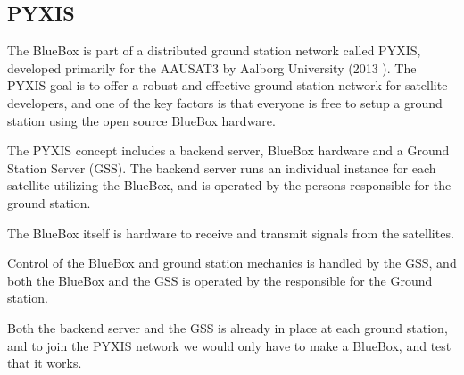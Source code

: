 \subsection{PYXIS}
The BlueBox is part of a distributed ground station network called PYXIS, developed primarily for the AAUSAT3 by Aalborg University (2013 \cite{aausat3}). The PYXIS goal is to offer a robust and effective ground station network for satellite developers, and one of the key factors is that everyone is free to setup a ground station using the open source BlueBox hardware. 

The PYXIS concept includes a backend server, BlueBox hardware and a Ground Station Server (GSS). The backend server runs an individual instance for each satellite utilizing the BlueBox, and is operated by the persons responsible for the ground station. 

The BlueBox itself is hardware to receive and transmit signals from the satellites.

Control of the BlueBox and ground station mechanics is handled by the GSS, and both the BlueBox and the GSS is operated by the responsible for the Ground station. 

Both the backend server and the GSS is already in place at each ground station, and to join the PYXIS network we would only have to make a BlueBox, and test that it works.


